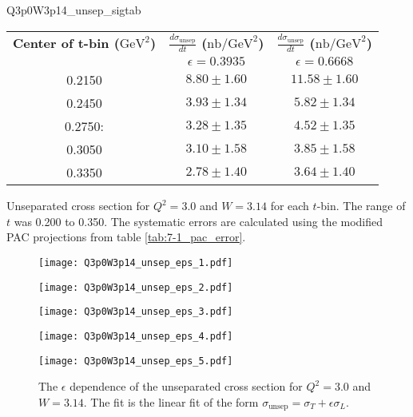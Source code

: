\begin{Mtable}{Q3p0W3p14_unsep_sigtab}
  \centering
  \begin{tabular}{|c|c|c|}
    \hline
    \textbf{Center of t-bin ($\mathrm{GeV}^2$)} & \textbf{$\frac{d\sigma_{\mathrm{unsep}}}{dt}$ ($\mathrm{nb/GeV}^2$)} & \textbf{$\frac{d\sigma_{\mathrm{unsep}}}{dt}$ ($\mathrm{nb/GeV}^2$)} \\
    & $\epsilon=0.3935$ & $\epsilon=0.6668$ \\
    \hline
    0.2150 & $8.80\pm1.60$ & $11.58\pm1.60$\\
    0.2450 & $3.93\pm1.34$ & $5.82\pm1.34$\\
    0.2750: & $3.28\pm1.35$ & $4.52\pm1.35$\\
    0.3050 & $3.10\pm1.58$ & $3.85\pm1.58$\\
    0.3350 & $2.78\pm1.40$ & $3.64\pm1.40$\\
    \hline
  \end{tabular}
  \caption{Unseparated cross section for $Q^2=3.0$ and $W=3.14$ for each $t$-bin. The range of $t$ was 0.200 to 0.350. The systematic errors are calculated using the modified PAC projections from table \ref{tab:7-1_pac_error}.}
  \label{tab:Q3p0W3p14_unsep_sigtab}
\end{Mtable}

\begin{figure}
  \centering
  \begin{minipage}[b]{0.48\linewidth}
    \texttt{[image: Q3p0W3p14\_unsep\_eps\_1.pdf]}
  \end{minipage}
  \hfill
  \begin{minipage}[b]{0.48\linewidth}
    \texttt{[image: Q3p0W3p14\_unsep\_eps\_2.pdf]}
  \end{minipage}
  \begin{minipage}[b]{0.48\linewidth}
    \texttt{[image: Q3p0W3p14\_unsep\_eps\_3.pdf]}
  \end{minipage}
  \hfill
  \begin{minipage}[b]{0.48\linewidth}
    \texttt{[image: Q3p0W3p14\_unsep\_eps\_4.pdf]}
  \end{minipage}
  \begin{minipage}[b]{0.48\linewidth}
    \texttt{[image: Q3p0W3p14\_unsep\_eps\_5.pdf]}
  \end{minipage}
  \caption{The $\epsilon$ dependence of the unseparated cross section for $Q^2=3.0$ and $W=3.14$. The fit is the linear fit of the form $\sigma_{\mathrm{unsep}}=\sigma_T+\epsilon\sigma_L$.}
  \label{fig:Q3p0W3p14_unsep_eps}
\end{figure}

